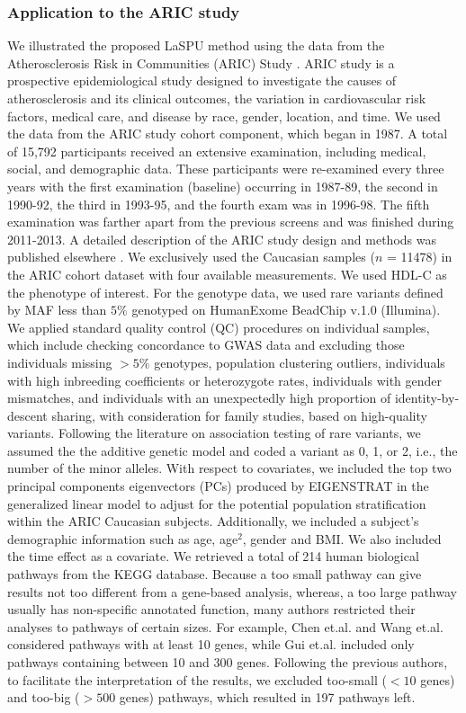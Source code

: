 \documentclass[12pt]{article}
\begin{document}
\subsubsection{Application to the ARIC study}
We illustrated the proposed LaSPU method using the data from the Atherosclerosis Risk in Communities (ARIC) Study \cite{Heiss1989}.  ARIC study is a prospective epidemiological study designed to investigate the causes of atherosclerosis and its clinical outcomes, the variation in cardiovascular risk factors, medical care, and disease by race, gender, location, and time. We used the data from the ARIC study cohort component, which began in 1987. A total of 15,792 participants received an extensive examination, including medical, social, and demographic data. These participants were re-examined every three years with the first examination (baseline) occurring in 1987-89, the second in 1990-92, the third in 1993-95, and the fourth exam was in 1996-98. The fifth examination was farther apart from the previous screens and was finished during 2011-2013. A detailed description of the ARIC study design and methods was published elsewhere \cite{Investigators1989}. We exclusively used the Caucasian samples ($n$ = 11478) in the ARIC cohort dataset with four available measurements. We used HDL-C as the phenotype of interest. For the genotype data, we used rare variants defined by MAF less than $5\%$ genotyped on HumanExome BeadChip v.1.0 (Illumina).\cite{Grove2013} We applied standard quality control (QC) procedures on individual samples, which include checking concordance to GWAS data and excluding those individuals missing $>5\%$ genotypes, population clustering outliers, individuals with high inbreeding coefficients or heterozygote rates, individuals with gender mismatches, and individuals with an unexpectedly high proportion of identity-by-descent sharing, with consideration for family studies, based on high-quality variants. Following the literature on association testing of rare variants, we assumed the the additive genetic model and coded a variant as 0, 1, or 2, i.e., the number of the minor alleles. With respect to covariates, we included the top two principal components eigenvectors (PCs) produced by EIGENSTRAT \cite{Price2006} in the generalized linear model to adjust for the potential population stratification within the ARIC Caucasian subjects. Additionally, we included a subject's demographic information such as age, age$^2$, gender and BMI. We also included the time effect as a covariate. We retrieved a total of 214 human biological pathways from the KEGG database.\cite{Ogata1999} Because a too small pathway can give results not too different from a gene-based analysis, whereas, a too large pathway usually has non-specific annotated function, many authors restricted their analyses to pathways of certain sizes. For example, Chen et.al.\cite{Chen2010} and Wang et.al.\cite{Wang2010} considered pathways with at least 10 genes, while Gui et.al.\cite{Gui2011} included only pathways containing between 10 and 300 genes. Following the previous authors, to facilitate the interpretation of the results, we excluded too-small ($<10$ genes) and too-big ($>500$ genes) pathways, which resulted in 197 pathways left. %
\end{document}

